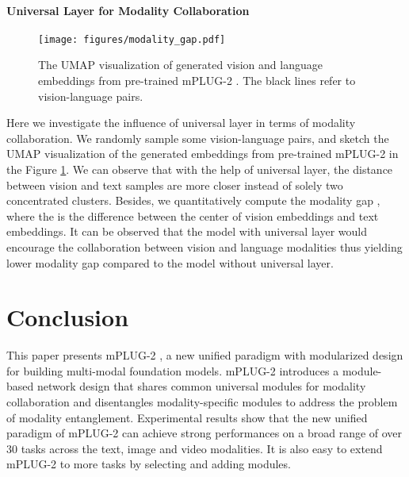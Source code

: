 \documentclass{article}
\theoremstyle{plain}
\theoremstyle{definition}
\theoremstyle{remark}
\newcommand{\modelname}{mPLUG-2 }
\begin{document}
\paragraph{Universal Layer for Modality Collaboration}
\begin{figure}
    \centering
    \texttt{[image: figures/modality\_gap.pdf]}
    \vspace{-3ex}
\caption{The UMAP visualization of generated vision and language embeddings from pre-trained \modelname. The black lines refer to vision-language pairs.}
\vspace{-2ex}
\label{fig:modality-gap}
\end{figure}
Here we investigate the influence of universal layer in terms of modality collaboration. We randomly sample some vision-language pairs, and sketch the UMAP visualization of the generated embeddings from pre-trained \modelname in the Figure \ref{fig:modality-gap}. We can observe that with the help of universal layer, the distance between vision and text samples are more closer instead of solely two concentrated clusters. Besides, we quantitatively compute the modality gap  \citep{liang2022mind}, where the  is the difference between the center of vision embeddings and text embeddings. It can be observed that the model with universal layer would encourage the collaboration between vision and language modalities thus yielding lower modality gap compared to the model without universal layer.








\vspace{-2ex}
\section{Conclusion}
This paper presents \modelname, a new unified paradigm with modularized design for building multi-modal foundation models. \modelname introduces a module-based network design that shares common universal modules for modality collaboration and disentangles modality-specific modules to address the problem of modality entanglement. Experimental results show that the new unified paradigm of \modelname can achieve strong performances on a broad range of over 30 tasks across the text, image and video modalities. It is also easy to extend \modelname to more tasks by selecting and adding modules.





\end{document}
